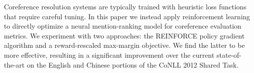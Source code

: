 Coreference resolution systems are typically trained with heuristic loss functions that require careful tuning. In this paper we instead apply reinforcement learning to directly optimize a neural mention-ranking model for coreference evaluation metrics. We experiment with two approaches: the REINFORCE policy gradient algorithm and a reward-rescaled max-margin objective. We find the latter to be more effective, resulting in a significant improvement over the current state-of-the-art on the English and Chinese portions of the CoNLL 2012 Shared Task.
